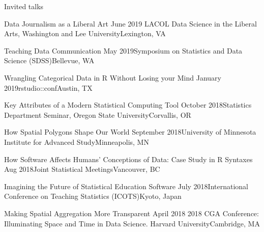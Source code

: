 \documentclass{resume} %
\begin{document}

\begin{rSection}{Invited talks}

\begin{sSubsection}{Data Journalism as a Liberal Art}{ }{June 2019}{ LACOL Data Science in the Liberal Arts, Washington and Lee University}{Lexington, VA}
\end{sSubsection}

\begin{sSubsection}{Teaching Data Communication}{ }{May 2019}{Symposium on Statistics and Data Science (SDSS)}{Bellevue, WA}
\end{sSubsection}

\begin{sSubsection}{Wrangling Categorical Data in R Without Losing your Mind}{ }{January 2019}{rstudio::conf}{Austin, TX}
\end{sSubsection}

\begin{sSubsection}{Key Attributes of a Modern Statistical Computing Tool}{ }{October 2018}{Statistics Department Seminar, Oregon State University}{Corvallis, OR}
\end{sSubsection}

\begin{sSubsection}{How Spatial Polygons Shape Our World}{ }{September 2018}{University of Minnesota Institute for Advanced Study}{Minneapolis, MN}
\end{sSubsection}

\begin{sSubsection}{How Software Affects Humans' Conceptions of Data: Case Study in R Syntaxes}{ }{Aug 2018}{Joint Statistical Meetings}{Vancouver, BC}
\end{sSubsection}

\begin{sSubsection}{Imagining the Future of Statistical Education Software}{ }{July 2018}{International Conference on Teaching Statistics (ICOTS)}{Kyoto, Japan}
\end{sSubsection}

\begin{sSubsection}{Making Spatial Aggregation More Transparent}{ }{April 2018}{ 2018 CGA Conference: Illuminating Space and Time in Data Science. Harvard University}{Cambridge, MA}
\end{sSubsection}


\end{rSection}
\end{document}
